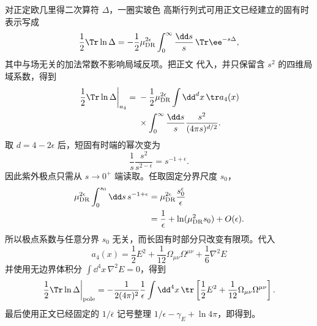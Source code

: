 \begin{derivation}[固有时积分中的一圈紫外发散]

对正定欧几里得二次算符 $\Delta$，一圈实玻色 高斯行列式可用正文已经建立的固有时表示写成
\[
\frac12\Tr\ln\Delta
=-\frac12\mu_{\rm DR}^{2\epsilon}
\int_0^\infty\frac{\dd s}{s}\,
\Tr \ee^{-s\Delta},
\]
其中与场无关的加法常数不影响局域反项。把正文 代入，并只保留含 $s^2$ 的四维局域系数，得到
\begin{align*}
\left.\frac12\Tr\ln\Delta\right|_{a_4}
={}&-\frac12\mu_{\rm DR}^{2\epsilon}
\int\dd^d x\,
\tr a_4(x)\\
&\times\int_0^\infty\frac{\dd s}{s}
\frac{s^2}{(4\pi s)^{d/2}}.
\end{align*}
取 $d=4-2\epsilon$ 后，短固有时端的幂次变为
\[
\frac1s\frac{s^2}{s^{2-\epsilon}}
=s^{-1+\epsilon}.
\]
因此紫外极点只需从 $s\to0^+$ 端读取。任取固定分界尺度 $s_0$，
\begin{align*}
\mu_{\rm DR}^{2\epsilon}
\int_0^{s_0}\dd s\,s^{-1+\epsilon}
&=\mu_{\rm DR}^{2\epsilon}
\frac{s_0^\epsilon}{\epsilon}\\
&=\frac1\epsilon
+\ln(\mu_{\rm DR}^2s_0)+O(\epsilon).
\end{align*}
所以极点系数与任意分界 $s_0$ 无关，而长固有时部分只改变有限项。代入
\[
 a_4(x)
 =\frac12E^2
 +\frac1{12}\Omega_{\mu\nu}\Omega^{\mu\nu}
 +\frac16\nabla^2E
\]
并使用无边界体积分
\(
\int\dd^4 x\,\nabla^2E=0
\)，得到
\[
\left.\frac12\Tr\ln\Delta\right|_{\rm pole}
=-\frac1{2(4\pi)^2}\frac1\epsilon
\int\dd^4 x\,
\tr\left[
\frac12E^2+\frac1{12}\Omega_{\mu\nu}\Omega^{\mu\nu}
\right].
\]
最后使用正文已经固定的 $1/\bar\epsilon$ 记号整理 $1/\epsilon-\gamma_E+\ln4\pi$，即得到。
\end{derivation}

















